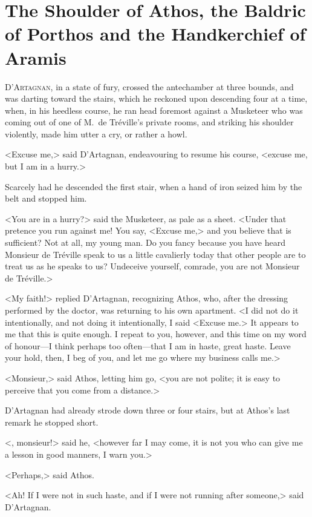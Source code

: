 
\chapter{The Shoulder of Athos, the Baldric of Porthos and the Handkerchief of Aramis} 

\lettrine{D}{'Artagnan}, in a state of fury, crossed the antechamber at three bounds, and was darting toward the stairs, which he reckoned upon descending four at a time, when, in his heedless course, he ran head foremost against a Musketeer who was coming out of one of M.~de Tréville's private rooms, and striking his shoulder violently, made him utter a cry, or rather a howl. 

<Excuse me,> said D'Artagnan, endeavouring to resume his course, <excuse me, but I am in a hurry.> 

Scarcely had he descended the first stair, when a hand of iron seized him by the belt and stopped him. 

<You are in a hurry?> said the Musketeer, as pale as a sheet. <Under that pretence you run against me! You say, <Excuse me,> and you believe that is sufficient? Not at all, my young man. Do you fancy because you have heard Monsieur de Tréville speak to us a little cavalierly today that other people are to treat us as he speaks to us? Undeceive yourself, comrade, you are not Monsieur de Tréville.> 

<My faith!> replied D'Artagnan, recognizing Athos, who, after the dressing performed by the doctor, was returning to his own apartment. <I did not do it intentionally, and not doing it intentionally, I said <Excuse me.> It appears to me that this is quite enough. I repeat to you, however, and this time on my word of honour—I think perhaps too often—that I am in haste, great haste. Leave your hold, then, I beg of you, and let me go where my business calls me.> 

<Monsieur,> said Athos, letting him go, <you are not polite; it is easy to perceive that you come from a distance.> 

D'Artagnan had already strode down three or four stairs, but at Athos's last remark he stopped short. 

<, monsieur!> said he, <however far I may come, it is not you who can give me a lesson in good manners, I warn you.> 

<Perhaps,> said Athos. 

<Ah! If I were not in such haste, and if I were not running after someone,> said D'Artagnan. 

